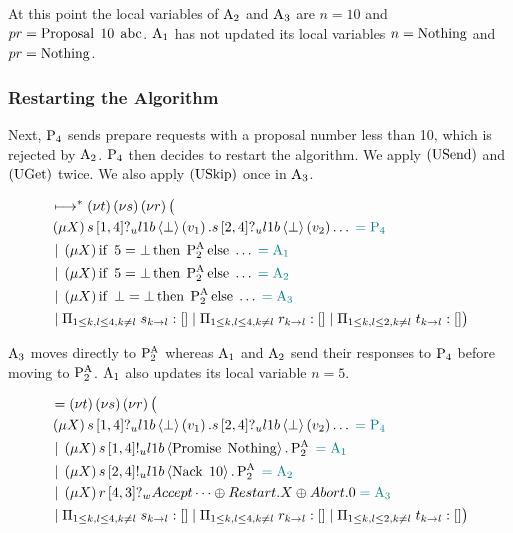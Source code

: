 At this point the local variables of $\Acceptor{2}$ and $\Acceptor{3}$ are $n = 10$ and $pr = \ProposalC{10}{\ABC}$.
$\Acceptor{1}$ has not updated its local variables $n = \Nothing$ and $pr = \Nothing$.

\subsubsection{Restarting the Algorithm}
Next, $\Proposer{4}$ sends prepare requests with a proposal number less than 10, which is rejected by $\Acceptor{2}$.
$\Proposer{4}$ then decides to restart the algorithm.
We apply $\RUsend$ and $\RUget$ twice.
We also apply $\RUskip$ once in $\Acceptor{3}$.

\begin{align*}
&\mapstostar \NuChannels \big (\\
&\Mu{X} \ReceiveUnreliableP{s}{1}{4}{\LOneB}{\bot}{v_1}.\ReceiveUnreliableP{s}{2}{4}{\LOneB}{\bot}{v_2}\dots \comment{= \Proposer{4}}\\
&\Or \Mu{X} \If{5 = \bot} \Then{\PaTwo} \Else{\dots} \comment{= \Acceptor{1}}\\
&\Or \Mu{X} \If{5 = \bot} \Then{\PaTwo} \Else{\dots} \comment{= \Acceptor{2}}\\
&\Or \Mu{X} \If{\bot = \bot} \Then{\PaTwo} \Else{\dots} \comment{= \Acceptor{3}}\\
&\Or \InnerSessionQueues{s}
\Or \InnerSessionQueues{r}
\Or \OuterSessionQueues
\big )
\end{align*}

$\Acceptor{3}$ moves directly to $\PaTwo$ whereas $\Acceptor{1}$ and $\Acceptor{2}$ send their responses to $\Proposer{4}$ before moving to $\PaTwo$.
$\Acceptor{1}$ also updates its local variable $n = 5$.

\begin{align*}
&= \NuChannels \big (\\
&\Mu{X} \ReceiveUnreliableP{s}{1}{4}{\LOneB}{\bot}{v_1}.\ReceiveUnreliableP{s}{2}{4}{\LOneB}{\bot}{v_2}\dots \comment{= \Proposer{4}}\\
&\Or \Mu{X} \SendUnreliableP{s}{1}{4}{\LOneB}{\Promise{\Nothing}}.\PaTwo \comment{= \Acceptor{1}}\\
&\Or \Mu{X} \SendUnreliableP{s}{2}{4}{\LOneB}{\Nack{10}}.\PaTwo \comment{= \Acceptor{2}}\\
&\Or \Mu{X} \ReceiveWeaklyP{r}{4}{3}{\BeginPaCont} \comment{= \Acceptor{3}}\\
&\Or \InnerSessionQueues{s}
\Or \InnerSessionQueues{r}
\Or \OuterSessionQueues
\big )
\end{align*}

